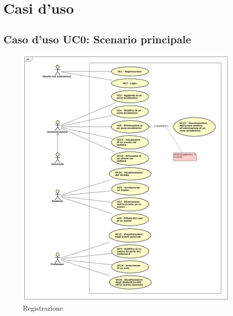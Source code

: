\section{Casi d'uso}
\subsection{Caso d'uso \texorpdfstring{UC0}{UC0}: Scenario principale }
\begin{figure} [H]
	\centering
	\includegraphics[scale=0.4]{./img/UC0.pdf}
	\caption{Registrazione }\label{}
\end{figure}
